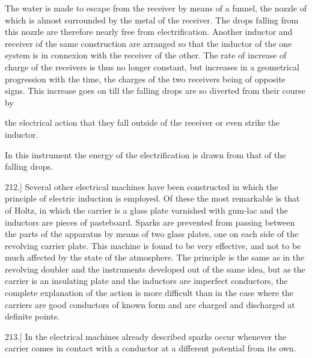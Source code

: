 \documentclass[11pt,a4paper]{article}
\begin{document}
The water is made to escape from the receiver by means of a funnel, the
nozzle of which is almost surrounded by the metal of the receiver. The
drops falling from this nozzle are therefore nearly free from
electrification. Another inductor and receiver of the same construction
are arranged so that the inductor of the one system is in connexion with
the receiver of the other. The rate of increase of charge of the
receivers is thus no longer constant, but increases in a geometrical
progression with the time, the charges of the two receivers being of
opposite signs. This increase goes on till the falling drops are so
diverted from their course by

\clearpage

the electrical action that they fall outside of the receiver or even
strike the inductor.

In this instrument the energy of the electrification is drawn from that
of the falling drops.

212.] Several other electrical machines have been constructed in which
the principle of electric induction is employed. Of these the most
remarkable is that of Holtz, in which the carrier is a glass plate
varnished with gum-lac and the inductors are pieces of pasteboard. Sparks
are prevented from passing between the parts of the apparatus by means of
two glass plates, one on each side of the revolving carrier plate. This
machine is found to be very effective, and not to be much affected by the
state of the atmosphere. The principle is the same as in the revolving
doubler and the instruments developed out of the same idea, but as the
carrier is an insulating plate and the inductors are imperfect
conductors, the complete explanation of the action is more difficult than
in the case where the carriers are good conductors of known form and are
charged and discharged at definite points.

213.] In the electrical machines already described sparks occur whenever
the carrier comes in contact with a conductor at a different potential
from its own.
\end{document}
